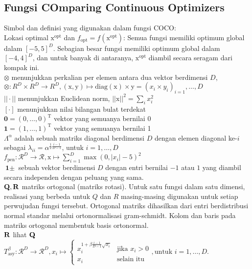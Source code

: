\subsection*{Fungsi COmparing Continuous Optimizers}
Simbol dan definisi yang digunakan dalam fungsi COCO:\\
Lokasi optimal $\mathrm{x}^{\text{opt}}$ dan $f_{\text{opt}} = f(\mathrm{x}^{\text{opt}})$: Semua fungsi memiliki optimum global dalam $[-5, 5]^D$. Sebagian besar fungsi memiliki optimum global dalam $[-4, 4]^D$, dan untuk banyak di antaranya, $\mathrm{x}^{\text{opt}}$ diambil secara seragam dari kompak ini.\\
\noindent$\otimes$ menunjukkan perkalian per elemen antara dua vektor berdimensi $D$, $\otimes:R^D\times R^D\to R^D, (\mathrm{x},\mathrm{y})\mapsto \text{diag}(\mathrm{x})\times\mathrm{y}=(x_i\times y_i)_{i=1},\ldots,D$\\
$||\cdot||$ menunjukkan Euclidean norm, $||\mathrm{x}||^2=\sum_{i}x^2_i$\\
$\left[\cdot\right]$ menunjukkan nilai bilangan bulat terdekat\\
$\textbf{0}=(0,\ldots,0)^{\mathrm{T}}$ vektor yang semuanya bernilai 0\\
$\textbf{1}=(1,\ldots,1)^{\mathrm{T}}$ vektor yang semuanya bernilai 1\\
$\Lambda^{\alpha}$ adalah sebuah matriks diagonal berdimensi $D$ dengan elemen diagonal ke-$i$ sebagai $\lambda_{ii}=\alpha^{\frac{1}{2}\frac{i-1}{D-1}}$, untuk $i=1,\ldots,D$\\
$f_{\text{pen}}:\mathcal{R}^D\to \mathcal{R}, \mathrm{x}\mapsto\sum_{i=1}^{D}\max(0,\left|x_i\right|-5)^2$\\
$\textbf{1}\pm$ sebuah vektor berdimensi $D$ dengan entri bernilai $-1$ atau $1$ yang diambil secara independen dengan peluang yang sama.\\
$\bf{Q, R}$ matriks ortogonal (matriks rotasi). Untuk satu fungsi dalam satu dimensi, realisasi yang berbeda untuk $Q$ dan $R$ masing-masing digunakan untuk setiap perwujudan fungsi tersebut. Ortogonal matriks dihasilkan dari entri berdistribusi normal standar melalui ortonormalisasi gram-schmidt. Kolom dan baris pada matriks ortogonal membentuk basis ortonormal.\\
$\bf{R}$ lihat $\bf{Q}$\\
$T_{\text{asy}}^{\beta}:\mathcal{R}^D\to \mathcal{R}^D,x_i\mapsto \begin{cases}
  x_i^{1+\beta\frac{i-1}{D-1}\sqrt{x_i}} & \text{jika } x_i > 0\\
  x_i & \text{selain itu}
\end{cases}, \text{untuk } i=1,\ldots,D$.\\
